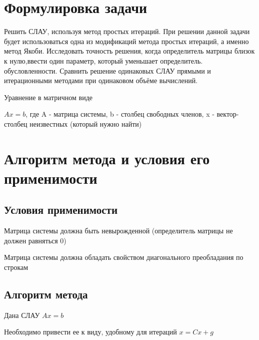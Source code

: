 






\section{Формулировка задачи}

Решить СЛАУ, используя метод простых итераций. При решении данной задачи будет использоваться одна из модификаций метода простых итераций, а именно метод Якоби. Исследовать точность решения, когда определитель матрицы близок к нулю,ввести один параметр, который уменьшает определитель.
обусловленности. Сравнить решение одинаковых СЛАУ прямыми и итерационными методами при одинаковом объёме вычислений. 

Уравнение в матричном виде 

\begin{math}
	Ax=b
\end{math},
где A - матрица системы, b - столбец свободных членов, x - вектор-столбец неизвестных (который нужно найти)

\section{Алгоритм метода и условия его применимости}

\subsection {Условия применимости}

Матрица системы должна быть невырожденной (определитель матрицы не должен равняться 0)

Матрица системы должна обладать свойством диагонального преобладания по строкам 

\subsection {Алгоритм метода}

Дана СЛАУ 
\begin{math}
	Ax=b
\end{math}

Необходимо привести ее к виду, удобному для итераций
\begin{math}
	x=Cx+g
\end{math}

